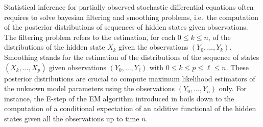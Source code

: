 \documentclass[12pt]{article}
\newcommand{\rmd}{\mathrm{d}}
\newcommand{\eqsp}{\;}
\newcommand{\1}{\mathrm{1}}
\newcommand{\qk}{q_{k}}
\begin{document}
Statistical inference for partially observed stochastic differential equations often requires to solve bayesian filtering and smoothing problems, i.e.\ the computation of the posterior distributions of sequences of hidden states given observations. The filtering problem refers to the estimation, for each $0\le k \le n$,  of the distributions of the hidden state $X_k$ given the observations $(Y_0,\ldots,Y_k)$. Smoothing stands for the estimation of the distributions of the sequence of states $(X_{k},\ldots,X_{p})$ given observations $(Y_{0},\ldots,Y_{\ell})$ with $0\le k\le p \le \ell \le n$. 
These posterior distributions are crucial to compute maximum likelihood estimators of the unknown model parameters using the observations $(Y_0,\ldots,Y_n)$ only.
For instance, the E-step of the EM algorithm introduced in \cite{dempster:laird:rubin:1977} %
boils down to the computation of a conditional expectation of an additive functional of the hidden states given all the observations up to time $n$. 
\end{document}
